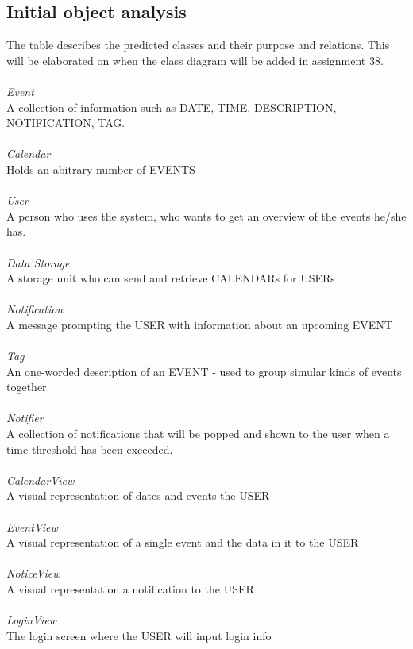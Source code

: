 \subsection{Initial object analysis}
The table describes the predicted classes and their purpose and relations. This will be elaborated on when the class diagram will be added in assignment 38.
\\
\HRule \\[0.4cm]
\emph{Event}\\
A collection of information such as DATE, TIME, DESCRIPTION, NOTIFICATION, TAG.\\
\HRule \\[0.4cm]
\emph{Calendar}\\
Holds an abitrary number of EVENTS\\
\HRule \\[0.4cm]
\emph{User}\\
A person who uses the system, who wants to get an overview of the events he/she has.\\
\HRule \\[0.4cm]
\emph{Data Storage}\\
A storage unit who can send and retrieve CALENDARs for USERs\\
\HRule \\[0.4cm]
\emph{Notification}\\
A message prompting the USER with information about an upcoming EVENT\\
\HRule \\[0.4cm]
\emph{Tag}\\
An one-worded description of an EVENT - used to group simular kinds of events together.\\
\HRule \\[0.4cm]
\emph{Notifier}\\
A collection of notifications that will be popped and shown to the user when a time threshold has been exceeded.\\
\HRule \\[0.4cm]
\emph{CalendarView}\\
A visual representation of dates and events the USER\\
\HRule \\[0.4cm]
\emph{EventView}\\
A visual representation of a single event and the data in it to the USER\\
\HRule \\[0.4cm]
\emph{NoticeView}\\
A visual representation a notification to the USER\\
\HRule \\[0.4cm]
\emph{LoginView}\\
The login screen where the USER will input login info\\
\HRule \\[0.4cm]

